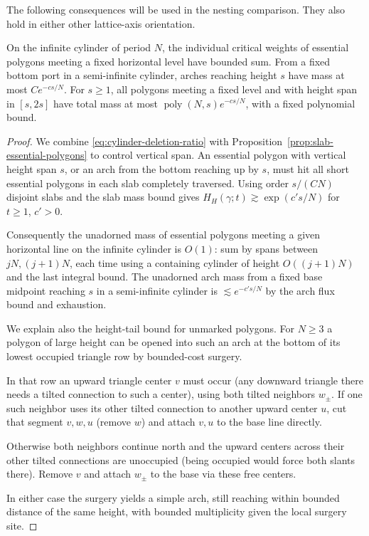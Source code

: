 The following consequences will be used in the nesting comparison. They also hold in either other lattice-axis orientation.
\begin{auxproposition}
On the infinite cylinder of period $N$, the individual critical weights of essential polygons meeting a fixed horizontal level have bounded sum. From a fixed bottom port in a semi-infinite cylinder, arches reaching height $s$ have mass at most $Ce^{-cs/N}$. For $s\ge1$, all polygons meeting a fixed level and with height span in $[s,2s]$ have total mass at most $\operatorname{poly}(N,s)e^{-cs/N}$, with a fixed polynomial bound.
\end{auxproposition}
\begin{proof}
We combine \eqref{eq:cylinder-deletion-ratio} with Proposition~\ref{prop:slab-essential-polygons} to control vertical span. An essential polygon with vertical height span \(s\), or an arch from the bottom reaching up by \(s\), must hit all short essential polygons in each slab completely traversed. Using order \(s/(CN)\) disjoint slabs and the slab mass bound gives \(H_H(\gamma;t)\gtrsim \exp(c' s/N)\) for \(t\ge1\), \(c'>0\).

Consequently the unadorned mass of essential polygons meeting a given horizontal line on the infinite cylinder is \(O(1)\): sum by spans between \(jN,(j+1)N\), each time using a containing cylinder of height \(O((j+1)N)\) and the last integral bound. The unadorned arch mass from a fixed base midpoint reaching \(s\) in a semi-infinite cylinder is \(\lesssim e^{-c' s/N}\) by the arch flux bound and exhaustion.

We explain also the height-tail bound for unmarked polygons. For $N\ge3$ a polygon of large height can be opened into such an arch at the bottom of its lowest occupied triangle row by bounded-cost surgery.

In that row an upward triangle center \(v\) must occur (any downward triangle there needs a tilted connection to such a center), using both tilted neighbors \(w_\pm\). If one such neighbor uses its other tilted connection to another upward center \(u\), cut that segment \(v,w,u\) (remove \(w\)) and attach \(v,u\) to the base line directly.

Otherwise both neighbors continue north and the upward centers across their other tilted connections are unoccupied (being occupied would force both slants there). Remove \(v\) and attach \(w_\pm\) to the base via these free centers.

In either case the surgery yields a simple arch, still reaching within bounded distance of the same height, with bounded multiplicity given the local surgery site.


\end{proof}
